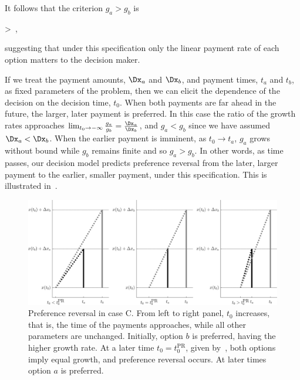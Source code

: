 It follows that the criterion $g_a > g_b$ is

\be
{} > \,,
\ee

suggesting that under this specification only the linear payment rate of each option matters to the decision maker.

If we treat the payment amounts, $\Dx_a$ and $\Dx_b$, and payment times, $t_a$ and $t_b$, as fixed parameters of the problem, then we can elicit the dependence of the decision on the decision time, $t_0$. When both payments are far ahead in the future, the larger, later payment is preferred. In this case the ratio of the growth rates approaches $\lim_{t_0\to-\infty}\frac{g_a}{g_b}=\frac{\Dx_a}{\Dx_b}$, and $g_a<g_b$ since we have assumed $\Dx_a<\Dx_b$. When the earlier payment is imminent, \ie as $t_0\to t_a$, $g_a$ grows without bound while $g_b$ remains finite and so $g_a>g_b$. In other words, as time passes, our decision model predicts preference reversal from the later, larger payment to the earlier, smaller payment, under this specification. This is illustrated in~.

\begin{figure}[!htb]
\centering
\includegraphics[width=1.0\textwidth]{./figures/caseC_reversal.jpg}
\caption{Preference reversal in case C. From left to right panel, $t_0$ increases, that is, the time of the payments approaches, while all other parameters are unchanged. Initially, option $b$ is preferred, having the higher growth rate. At a later time $t_0=t_0^\text{PR}$, given by~, both options imply equal growth, and preference reversal occurs. At later times option $a$ is preferred.}
\end{figure}



